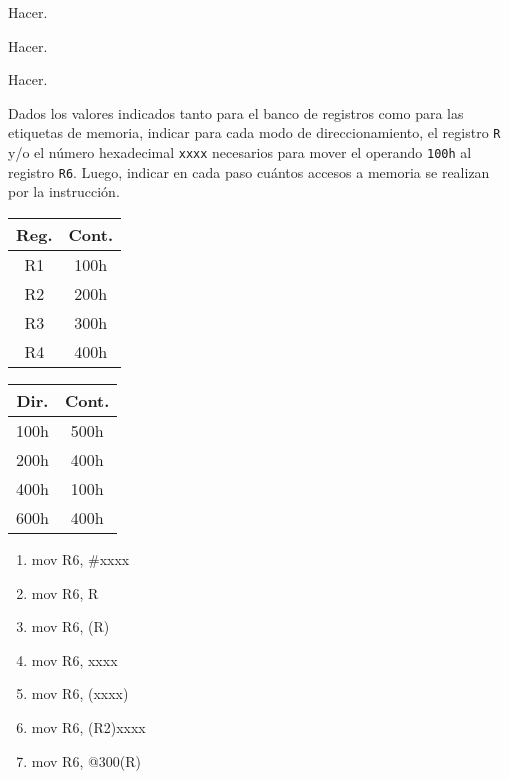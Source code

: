 \documentclass[12pt,a4paper]{article}
\begin{document}

 Hacer.

 Hacer.

 Hacer.

\newpage

 Dados los valores indicados tanto para el banco de registros como para las etiquetas de memoria, indicar para cada modo de direccionamiento, el registro \texttt{R} y/o el número hexadecimal \texttt{xxxx} necesarios para mover el operando \texttt{100h} al registro \texttt{R6}. Luego, indicar en cada paso cuántos accesos a memoria se realizan por la instrucción.
\begin{center}
	\begin{minipage}{0.17\textwidth}
		\begin{tabular}{|c|c|} \hline
			Reg. & Cont. \\\hline
			R1 & 100h \\\hline
			R2 & 200h \\\hline
			R3 & 300h \\\hline
			R4 & 400h \\\hline
		\end{tabular}
	\end{minipage}
	\begin{minipage}{0.17\textwidth}
		\begin{tabular}{|c|c|} \hline
			Dir. & Cont. \\\hline
			100h & 500h \\\hline
			200h & 400h \\\hline
			400h & 100h \\\hline
			600h & 400h \\\hline
		\end{tabular}
	\end{minipage}
	\begin{minipage}{0.3\textwidth}
		\begin{enumerate}[(1)]
			\itemsep -5pt
			\item mov R6, \#xxxx
			\item mov R6, R
			\item mov R6, (R)
			\item mov R6, xxxx
			\item mov R6, (xxxx)
			\item mov R6, (R2)xxxx
			\item mov R6, @300(R)
		\end{enumerate}
	\end{minipage}

\end{center}
\end{document}
